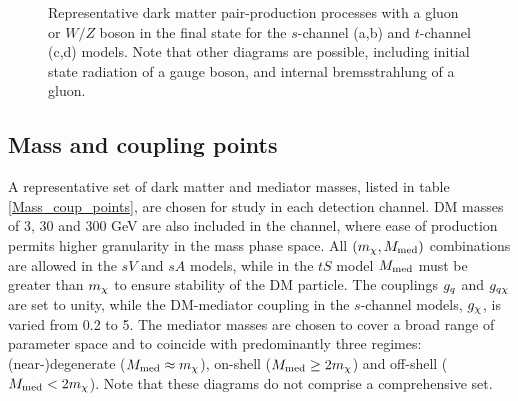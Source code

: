 \begin{figure}[t]
\begin{subfigure}[b]{0.4\textwidth}
{
    }
    \caption{}
    \label{fig:FD_tS_gluonISR}
  \end{subfigure}
  \hspace{1cm}
  \begin{subfigure}[b]{0.4\textwidth}
    \centering
    \caption{}
    \label{fig:FD_tS_WZmediator}
  \end{subfigure}
  \caption{Representative dark matter pair-production processes with a gluon or $W/Z$ boson in the final state for the $s$-channel (a,b) and $t$-channel (c,d) models. Note that other diagrams are possible, including initial state radiation of a gauge boson, and internal bremsstrahlung of a gluon.}
  \label{allchannel_sig_phen}
\end{figure}

\subsection{Mass and coupling points}
A representative set of dark matter and mediator masses, listed in table \ref{Mass_coup_points}, are chosen for study in each detection channel. DM masses of 3, 30 and 300 GeV are also included in the \monoZ channel, where ease of production permits higher granularity in the mass phase space. All $(m_{\chi}, M_{\mathrm{med}})$ combinations are allowed in the $sV$ and $sA$ models, while in the $tS$ model $M_{\mathrm{med}}$ must be greater than $m_{\chi}$ to ensure stability of the DM particle. The couplings $g_q$ and $g_{q \chi}$ are set to unity, while the DM-mediator coupling in the $s$-channel models, $g_{\chi}$, is varied from 0.2 to 5. The mediator masses are chosen to cover a broad range of parameter space and to coincide with predominantly three regimes: (near-)degenerate ($M_{\mathrm{med}} \approx m_{\chi}$), on-shell ($M_{\mathrm{med}} \geq 2 m_{\chi}$) and off-shell ($M_{\mathrm{med}} < 2 m_{\chi}$). Note that these diagrams do not comprise a comprehensive set.


